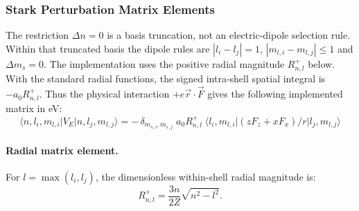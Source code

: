 \documentclass[11pt,a4paper]{article}
\numberwithin{equation}{section}
\begin{document}
\subsubsection{Stark Perturbation Matrix Elements}
The restriction $\Delta n=0$ is a basis truncation, not an electric-dipole selection rule. Within that truncated basis the dipole rules are $|l_i-l_j|=1$, $|m_{l,i}-m_{l,j}|\le1$ and $\Delta m_s=0$. The implementation uses the positive radial magnitude $R^+_{n,l}$ below. With the standard radial functions, the signed intra-shell spatial integral is $-a_0R^+_{n,l}$. Thus the physical interaction $+e\vec r\cdot\vec F$ gives the following implemented matrix in eV:
\begin{equation}
\langle n, l_i, m_{l,i} | V_E | n, l_j, m_{l,j} \rangle
= -\,\delta_{m_{s,i},m_{s,j}}\;
  a_0 R^+_{n,l}\;
  \bigl\langle l_i, m_{l,i} \big| (z F_z + x F_x)/r \big| l_j, m_{l,j} \bigr\rangle
\end{equation}

\paragraph{Radial matrix element.}
For $l = \max(l_i, l_j)$, the dimensionless within-shell radial magnitude is:
\begin{equation}
R^+_{n,l} = \frac{3n}{2Z}\sqrt{n^2 - l^2}.
\end{equation}
\end{document}
